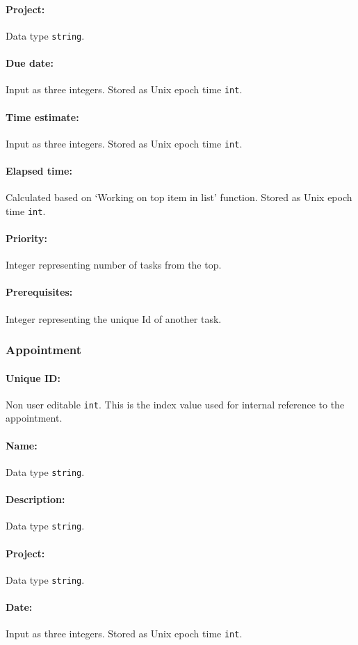 \documentclass[12pt]{article}
\newcommand{\e}[1] {{\tt #1}}
\begin{document}
\paragraph{Project:} Data type \e{string}.
\paragraph{Due date:} Input as three integers. Stored as Unix epoch time \e{int}.
\paragraph{Time estimate:} Input as three integers. Stored as Unix epoch time \e{int}.
\paragraph{Elapsed time:} Calculated based on `Working on top item in list' function. Stored as Unix epoch time \e{int}. 
\paragraph{Priority:} Integer representing number of tasks from the top.
\paragraph{Prerequisites:} Integer representing the unique Id of another task.

\subsubsection{Appointment} \label{sec:Appointment}
\paragraph{Unique ID:} Non user editable \e{int}. This is the index value used for internal reference to the appointment. 
\paragraph{Name:} Data type \e{string}.
\paragraph{Description:} Data type \e{string}.
\paragraph{Project:} Data type \e{string}.
\paragraph{Date:} Input as three integers. Stored as Unix epoch time \e{int}.
\end{document}
